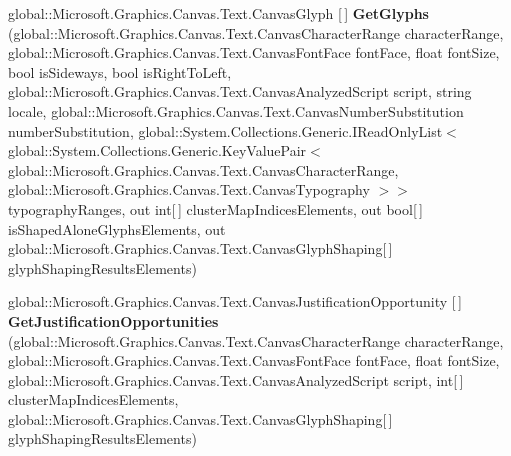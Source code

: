 \begin{DoxyCompactItemize}
\item 
\mbox{\label{interface_microsoft_1_1_graphics_1_1_canvas_1_1_text_1_1_i_canvas_text_analyzer_a198843bd363ffbb2a16d85d6439972ce}} 
global\+::\+Microsoft.\+Graphics.\+Canvas.\+Text.\+Canvas\+Glyph \mbox{[}$\,$\mbox{]} {\bfseries Get\+Glyphs} (global\+::\+Microsoft.\+Graphics.\+Canvas.\+Text.\+Canvas\+Character\+Range character\+Range, global\+::\+Microsoft.\+Graphics.\+Canvas.\+Text.\+Canvas\+Font\+Face font\+Face, float font\+Size, bool is\+Sideways, bool is\+Right\+To\+Left, global\+::\+Microsoft.\+Graphics.\+Canvas.\+Text.\+Canvas\+Analyzed\+Script script, string locale, global\+::\+Microsoft.\+Graphics.\+Canvas.\+Text.\+Canvas\+Number\+Substitution number\+Substitution, global\+::\+System.\+Collections.\+Generic.\+I\+Read\+Only\+List$<$ global\+::\+System.\+Collections.\+Generic.\+Key\+Value\+Pair$<$ global\+::\+Microsoft.\+Graphics.\+Canvas.\+Text.\+Canvas\+Character\+Range, global\+::\+Microsoft.\+Graphics.\+Canvas.\+Text.\+Canvas\+Typography $>$$>$ typography\+Ranges, out int\mbox{[}$\,$\mbox{]} cluster\+Map\+Indices\+Elements, out bool\mbox{[}$\,$\mbox{]} is\+Shaped\+Alone\+Glyphs\+Elements, out global\+::\+Microsoft.\+Graphics.\+Canvas.\+Text.\+Canvas\+Glyph\+Shaping\mbox{[}$\,$\mbox{]} glyph\+Shaping\+Results\+Elements)
\item 
\mbox{\label{interface_microsoft_1_1_graphics_1_1_canvas_1_1_text_1_1_i_canvas_text_analyzer_a8b4e8e82cde2cb867edd74bb7ed467e5}} 
global\+::\+Microsoft.\+Graphics.\+Canvas.\+Text.\+Canvas\+Justification\+Opportunity \mbox{[}$\,$\mbox{]} {\bfseries Get\+Justification\+Opportunities} (global\+::\+Microsoft.\+Graphics.\+Canvas.\+Text.\+Canvas\+Character\+Range character\+Range, global\+::\+Microsoft.\+Graphics.\+Canvas.\+Text.\+Canvas\+Font\+Face font\+Face, float font\+Size, global\+::\+Microsoft.\+Graphics.\+Canvas.\+Text.\+Canvas\+Analyzed\+Script script, int\mbox{[}$\,$\mbox{]} cluster\+Map\+Indices\+Elements, global\+::\+Microsoft.\+Graphics.\+Canvas.\+Text.\+Canvas\+Glyph\+Shaping\mbox{[}$\,$\mbox{]} glyph\+Shaping\+Results\+Elements)
\item 
\mbox{\label{interface_microsoft_1_1_graphics_1_1_canvas_1_1_text_1_1_i_canvas_text_analyzer_a591e2b96c883de04bb901715834d4f5a}} 
$$
\end{DoxyCompactItemize}

